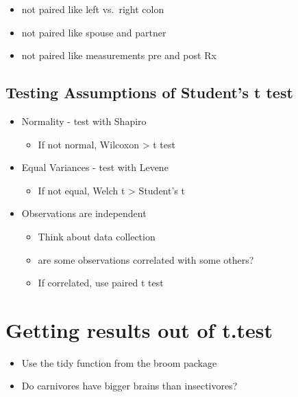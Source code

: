 \documentclass[
]{book}
\providecommand{\tightlist}{%
  \setlength{\itemsep}{0pt}\setlength{\parskip}{0pt}}
\begin{document}
\begin{itemize}
\tightlist
\item
  not paired like left vs.~right colon
\item
  not paired like spouse and partner
\item
  not paired like measurements pre and post Rx
\end{itemize}

\hypertarget{testing-assumptions-of-students-t-test}{%
\subsection{Testing Assumptions of Student's t test}\label{testing-assumptions-of-students-t-test}}

\begin{itemize}
\tightlist
\item
  Normality - test with Shapiro

  \begin{itemize}
  \tightlist
  \item
    If not normal, Wilcoxon \textgreater{} t test
  \end{itemize}
\item
  Equal Variances - test with Levene

  \begin{itemize}
  \tightlist
  \item
    If not equal, Welch t \textgreater{} Student's t
  \end{itemize}
\item
  Observations are independent

  \begin{itemize}
  \tightlist
  \item
    Think about data collection
  \item
    are some observations correlated with some others?
  \item
    If correlated, use paired t test
  \end{itemize}
\end{itemize}

\hypertarget{getting-results-out-of-t.test}{%
\section{Getting results out of t.test}\label{getting-results-out-of-t.test}}

\begin{itemize}
\tightlist
\item
  Use the tidy function from the broom package
\item
  Do carnivores have bigger brains than insectivores?
\end{itemize}
\end{document}
